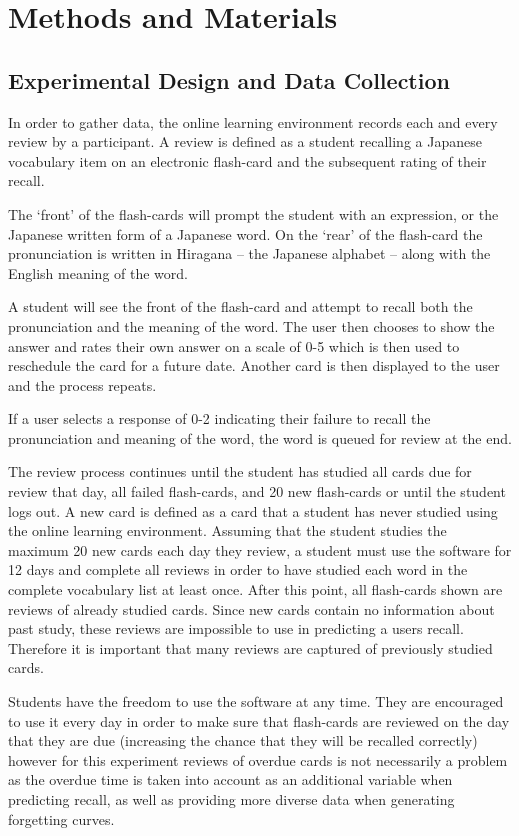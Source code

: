 \chapter{Methods and Materials}
\label{methods}

\section{Experimental Design and Data Collection}
In order to gather data, the online learning environment records each and every review
by a participant. A review is defined as a student recalling a Japanese vocabulary item on
an electronic flash-card and the subsequent rating of their recall.

The `front' of the flash-cards will prompt the student with an expression, or
the Japanese written form of a Japanese word. On the `rear' of the flash-card the pronunciation
is written in Hiragana -- the Japanese alphabet -- along with the English meaning of the word.

A student will see the front of the flash-card and attempt to recall both the pronunciation
and the meaning of the word. The user then chooses to show the answer and rates their own answer on
a scale of 0-5 which is then used to reschedule the card for a future date. Another card is
then displayed to the user and the process repeats.

If a user selects a response of 0-2 indicating their failure to recall the pronunciation
and meaning of the word, the word is queued for review at the end.

The review process continues until the student has studied all cards due for review that day, all
failed flash-cards, and 20 new flash-cards or until the student logs out. A new card is defined
as a card that a student has never studied using the online learning environment. Assuming that
the student
studies the maximum 20 new cards each day they review, a student must use the software for 12 days
and complete all reviews in order to have studied each word in the complete vocabulary list at
least once. After this point,
all flash-cards shown are reviews of already studied cards. Since new cards contain no
information about past study,
these reviews are impossible to use in predicting a users recall. Therefore it is important
that many reviews are captured of previously studied cards.

Students have the freedom to use the software at any time. They are encouraged to use it every day in order
to make sure that flash-cards are reviewed on the day that they are due (increasing the chance
that they will be recalled correctly) however for this experiment reviews of overdue cards is not
necessarily a problem as the overdue time is taken into account as an additional variable when
predicting recall, as well as providing more diverse data when generating forgetting curves.

